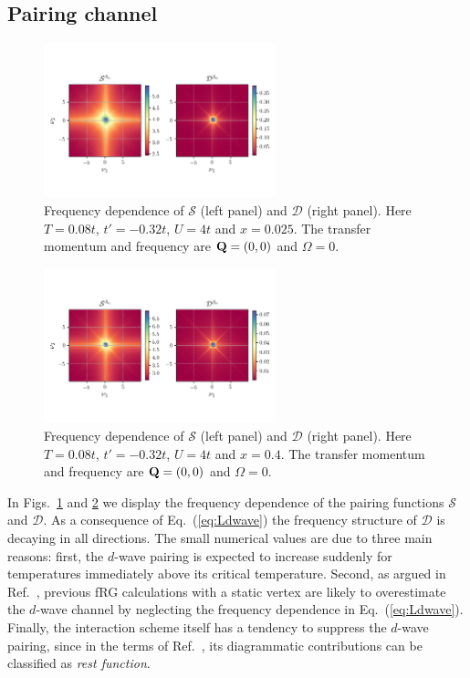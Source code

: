 \subsection{Pairing channel}
\label{sec:appPairingChannel}
\begin{figure}
\includegraphics[width=0.60\textwidth]{images/Phi_color_s_d_wave_SE_fill0_975.png}
\caption{Frequency dependence of $\mathcal{S}$ (left panel) and $\mathcal{D}$ (right panel). Here $T=0.08t$, $t'=-0.32t$, $U=4t$ and $x=0.025$. The transfer momentum and frequency are $\mathbf{Q}=(0,0)$ and $\Omega=0$.}
\label{fig:pairing975}
\end{figure}
\begin{figure}
\includegraphics[width=0.60\textwidth]{images/Phi_color_s_d_wave_SE_fill0_600.png}
\caption{Frequency dependence of $\mathcal{S}$ (left panel) and $\mathcal{D}$ (right panel). Here $T=0.08t$, $t'=-0.32t$, $U=4t$ and $x=0.4$. The transfer momentum and frequency are $\mathbf{Q}=(0,0)$ and $\Omega=0$.}
\label{fig:pairing600}
\end{figure}
In Figs.~\ref{fig:pairing975} and \ref{fig:pairing600} we display the frequency dependence of the pairing functions $\mathcal{S}$ and $\mathcal{D}$. 
As a consequence of Eq.~(\ref{eq:Ldwave}) the frequency structure of $\mathcal{D}$ is decaying in all directions.\cite{Wentzell2016}
The small numerical values are due to three main reasons: 
first, the $d$-wave pairing is expected to increase suddenly for temperatures immediately above its critical temperature. 
Second, as argued in Ref.~, previous fRG calculations with a static vertex are likely to overestimate the $d$-wave channel by neglecting the frequency dependence in Eq.~(\ref{eq:Ldwave}). 
Finally, the interaction scheme itself has a tendency to suppress the $d$-wave pairing, since in the terms of Ref.~, its diagrammatic contributions can be classified as \emph{rest function}.
 